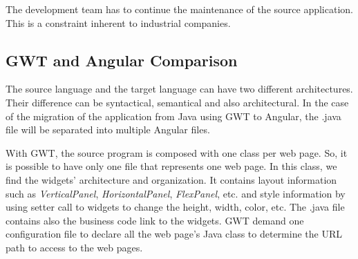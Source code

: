 \documentclass[conference]{IEEEtran}
\begin{document}
    The development team has to continue the maintenance of the source application.
    This is a constraint inherent to industrial companies.
    
    \subsection{GWT and Angular Comparison}
    The source language and the target language can have two different architectures.
    Their difference can be syntactical, semantical and also architectural. %
    In the case of the migration of the application from Java using GWT to Angular, 
        the .java file will be separated into multiple Angular files.
    
    With GWT, the source program is composed with one class per web page.
    So, it is possible to have only one file that represents one web page.
    In this class, we find the widgets' architecture and organization.
    It contains layout information such as \textit{VerticalPanel}, \textit{HorizontalPanel}, \textit{FlexPanel}, etc.
        and style information by using setter call to widgets to change the height, width, color, etc.
    The .java file contains also the business code link to the widgets.
    GWT demand one configuration file to declare all the web page's Java class to
        determine the URL path to access to the web pages.
    
    \begin{table}[hbtp]
    \caption{Comparison of GWT architecture and Angular one}
    \label{tab:gwtArchitectureToAngular}
    \begin {center}
    \end{center}
    \end{table}
    
\end{document}

